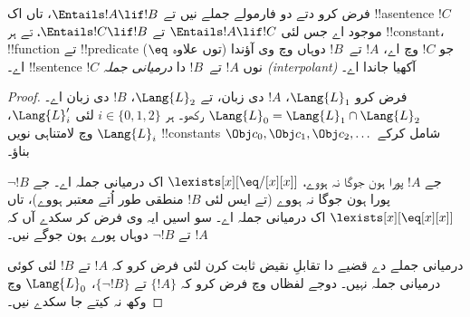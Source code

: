 \documentclass[../../../include/open-logic-section]{subfiles}
\begin{document}


\begin{thm}
فرض کرو دتے دو فارمولے جملے نیں تے
$\Entails !A \lif !B$، تاں اک !!a{sentence}
$!C$ موجود اے جس لئی
$\Entails !A \lif !C$ تے
$\Entails !C \lif !B$، تے ہر
!!{constant}، !!{function} تے
!!{predicate} ($\eq$ توں علاوہ)
جو $!C$ وچ اے، $!A$
تے~$!B$ دوہاں وچ وی آؤندا اے۔
!!{sentence} $!C$ نوں $!A$ تے~$!B$
دا \emph{درمیانی جملہ (interpolant)}
آکھیا جاندا اے۔
\end{thm}

\begin{proof}
فرض کرو $\Lang{L}_1$، $!A$ دی زبان،
تے $\Lang{L}_2$، $!B$ دی زبان اے۔
$\Lang{L}_0 = \Lang{L}_1 \cap \Lang{L}_2$
رکھو۔ ہر $i \in \{0, 1, 2 \}$ لئی
$\Lang{L}'_i$، $\Lang{L}_i$ وچ
لامتناہی نویں !!{constant}s $\Obj c_0,
\Obj c_1, \Obj c_2, \dots$ شامل کرکے بناؤ۔

جے $!A$ پورا ہون جوگا نہ ہووے،
$\lexists[x][\eq/[x][x]]$ اک درمیانی
جملہ اے۔ جے $\lnot !B$ پورا ہون جوگا
نہ ہووے (تے ایس لئی $!B$ منطقی طور
اُتے معتبر ہووے)، تاں
$\lexists[x][\eq[x][x]]$ اک درمیانی
جملہ اے۔ سو اسیں ایہ وی فرض کر سکدے آں
کہ $!A$ تے $\lnot !B$ دوہاں
پورے ہون جوگے نیں۔

درمیانی جملے دے قضیے دا تقابلِ نقیض
ثابت کرن لئی فرض کرو کہ $!A$ تے
$!B$ لئی کوئی درمیانی جملہ نہیں۔
دوجے لفظاں وچ فرض کرو کہ $\{!A\}$
تے $\{\lnot !B\}$،
$\Lang{L}_0$ وچ وکھ نہ کیتے
جا سکدے نیں۔


\end{proof}
\end{document}
